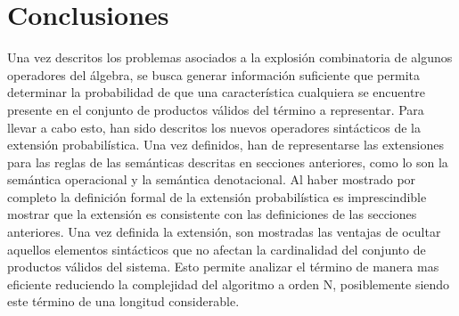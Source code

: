 \section{Conclusiones}
\label{section:jstat:concs}

Una vez descritos los problemas asociados a la explosión combinatoria de
algunos operadores del álgebra, se busca generar información suficiente
que permita determinar la probabilidad de que una característica cualquiera
se encuentre presente en el conjunto de productos válidos del término
a representar.
%
Para llevar a cabo esto, han sido descritos los nuevos operadores sintácticos
de la extensión probabilística. Una vez definidos, han de representarse las 
extensiones para las reglas de las semánticas descritas en secciones anteriores,
como lo son la semántica operacional y la semántica denotacional.
%
Al haber mostrado por completo la definición formal de la extensión probabilística
es imprescindible mostrar que la extensión es consistente con las definiciones de las
secciones anteriores.
%
Una vez definida la extensión, son mostradas las ventajas de ocultar aquellos elementos
sintácticos que no afectan la cardinalidad del conjunto de productos válidos del sistema.
Esto permite analizar el término de manera mas eficiente reduciendo la complejidad del
algoritmo a orden N, posiblemente siendo este término de una longitud considerable.
